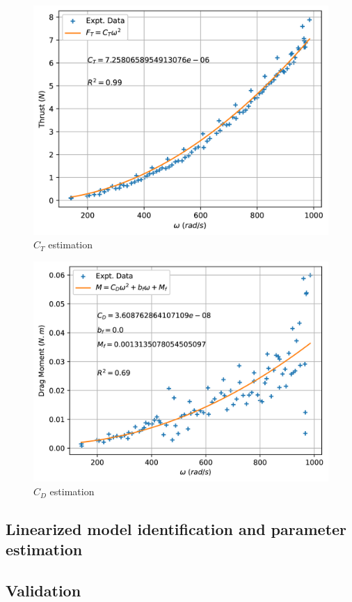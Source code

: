 \begin{minipage}{0.49\textwidth}
\begin{figure}[H]
    \centering
    \includegraphics[width = \textwidth]{Part2/figs/3_figs/aero/Thrust_curve.png}
\caption{$C_T$ estimation}
\label{fig::CT}
\end{figure}
\end{minipage}
\begin{minipage}{0.49\textwidth}
\begin{figure}[H]
    \centering
    \includegraphics[width = \textwidth]{Part2/figs/3_figs/aero/Drag_curve.png}
    \caption{$C_D$ estimation}
    \label{fig::CD}
\end{figure}
\end{minipage}

\subsection{Linearized model identification and parameter estimation}

\subsection{Validation}


